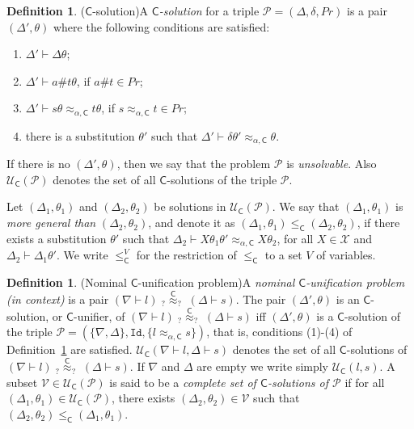\documentclass[submission,copyright,creativecommons]{eptcs}
\newcommand{\caleq}{\approx_{\alpha,\theory{C}}}
\newcommand{\theory}[1]{\ensuremath{\mathsf{#1}}}
\theoremstyle{plain}
\theoremstyle{definition}
\newtheorem{definition}[theorem]{Definition}
\theoremstyle{remark}
\begin{document}
\begin{definition}{($\theory{C}$-solution)}\label{def:csolution}
A \emph{$\theory{C}$-solution} for a triple $\mathcal{P} = (\Delta, \delta, Pr) $ is a pair $(\Delta',\theta)$ where the following conditions are satisfied:
\begin{enumerate}
    \item $\Delta' \vdash \Delta\theta$;
    \item $\Delta' \vdash a\#t\theta$, if $a\#t \in Pr$;
    \item $\Delta' \vdash s\theta \caleq t\theta$, if $s \caleq t \in Pr$;
    \item there is a substitution $\theta'$ such that $\Delta' \vdash \delta\theta' \caleq \theta$.
\end{enumerate}
If there is no $(\Delta', \theta)$, then we say that the problem $\mathcal{P}$ is \emph{unsolvable}. Also $\mathcal{U}_{\theory{C}}(\mathcal{P})$ denotes the set of all $\theory{C}$-solutions of the triple $\mathcal{P}$.
\end{definition}
Let 
 $(\Delta_1, \theta_1)$ and $(\Delta_2, \theta_2)$ be solutions in $\mathcal{U}_{\theory{C}}(\mathcal{P})$. We say that $(\Delta_1, \theta_1)$ is \emph{more general than} $(\Delta_2, \theta_2)$, and denote it as $(\Delta_1,\theta_1) \leq_{\theory{C}} (\Delta_2, \theta_2)$, if there exists a substitution $\theta'$ such that $\Delta_2 \vdash X\theta_1\theta' \caleq X\theta_2$, for all $X\in \mathcal{X}$ and $\Delta_2 \vdash \Delta_1\theta'$. 
We write $\leq^V_\theory{C}$ for the restriction of $\leq_{\theory{C}}$ to a set $V$ of variables.
\begin{definition}{(Nominal $\theory{C}$-unification problem)}\label{def:nominalCunif}
A \emph{nominal $\theory{C}$-unification problem (in context)} is a pair 
 $(\nabla\vdash l)\;_?{\overset{\theory{C}}{\approx}}_?  \; (\Delta\vdash s)$.
The pair $(\Delta',\theta)$ is an $\theory{C}$-solution, or  $\theory{C}$-unifier, of $(\nabla\vdash l) \;_?{\overset{\theory{C}}{\approx}}_?  \; (\Delta\vdash s)$ iff
$(\Delta',\theta)$ is a $\theory{C}$-solution of the triple
$ \mathcal{P}= (\{\nabla,\Delta \}, \texttt{Id}, \{l\caleq s\})$, that is, 
conditions (1)-(4) of Definition~\ref{def:csolution} are satisfied.
$\mathcal{U}_{\theory{C}}(\nabla\vdash l,\Delta\vdash s)$ denotes the set of all $\theory{C}$-solutions of $(\nabla\vdash l) \;_?{\overset{\theory{C}}{\approx}}_?  \; (\Delta\vdash s)$.
If $\nabla$ and $\Delta$ are empty we write  simply $\mathcal{U}_{\theory{C}}(l,s)$. 
A subset $\mathcal{V}\in \mathcal{U}_{\theory{C}}(\mathcal{P})$ is said to be a \emph{complete set of $\theory{C}$-solutions of $\mathcal{P}$} if for all $(\Delta_1,\theta_1) \in \mathcal{U}_{\theory{C}}(\mathcal{P})$, there exists $(\Delta_2, \theta_2) \in \mathcal{V}$ such that $(\Delta_2,\theta_2) \leq_{\theory{C}} (\Delta_1, \theta_1)$.
\end{definition}
\end{document}
